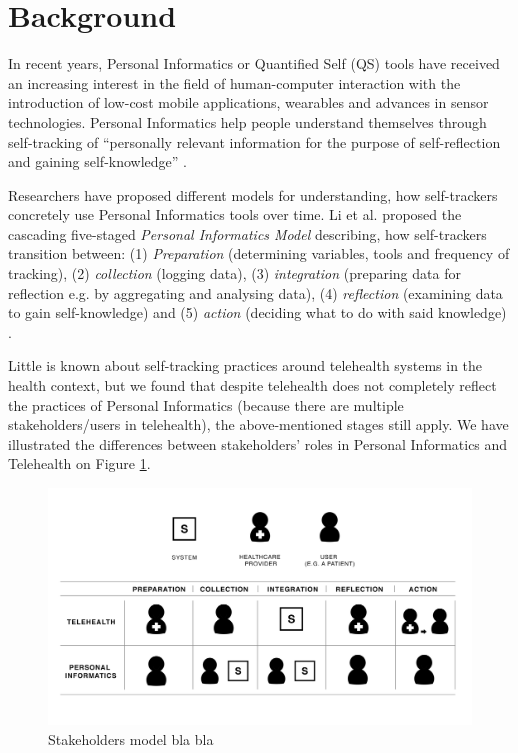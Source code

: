 \section{Background} 
In recent years, Personal Informatics or Quantified Self (QS) tools have received an increasing interest in the field of human-computer interaction with the introduction of low-cost mobile applications, wearables and advances in sensor technologies. Personal Informatics help people understand themselves through self-tracking of “personally relevant information for the purpose of self-reflection and gaining self-knowledge” \cite{Li2010}. 

Researchers have proposed different models for understanding, how self-trackers concretely use Personal Informatics tools over time. Li et al. proposed the cascading five-staged \textit{Personal Informatics Model} describing, how self-trackers transition between: (1) \textit{Preparation} (determining variables, tools and frequency of tracking), (2) \textit{collection} (logging data), (3) \textit{integration} (preparing data for reflection e.g. by aggregating and analysing data), (4) \textit{reflection} (examining data to gain self-knowledge) and (5) \textit{action} (deciding what to do with said knowledge) \cite{Li2010}. 

Little is known about self-tracking practices around telehealth systems in the health context, but we found that despite telehealth does not completely reflect the practices of Personal Informatics (because there are multiple stakeholders/users in telehealth), the above-mentioned stages still apply. We have illustrated the differences between stakeholders’ roles in Personal Informatics and Telehealth on Figure \ref{fig:StakeholdersModel}. 


\begin{figure}[!h]
\centering
\includegraphics[width=0.9\columnwidth]{img/StakeholdersModel}
\caption{Stakeholders model bla bla}
\label{fig:StakeholdersModel}
\end{figure}

